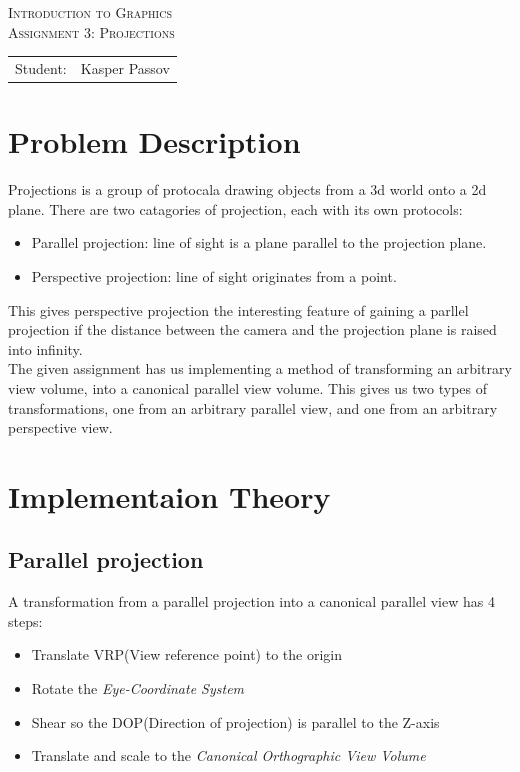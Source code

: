 \documentclass{article}
\begin{document}
\begin{titlepage}
\begin{center}
\textsc{Introduction to Graphics}\\[0.5cm]
\textsc{Assignment 3: Projections}\\[0.5cm]
\vspace{2 cm}
\begin{tabular}{ll}
Student: & Kasper Passov\\
\end{tabular}
\end{center}
\vspace{5 cm}
\newpage
\end{titlepage}

\section{Problem Description}
Projections is a group of protocala drawing objects 
from a 3d world onto a 2d plane. There are two catagories
of projection, each with its own protocols:
\begin{itemize}
    \item{Parallel projection:} line of sight is a plane parallel to the projection plane.
    \item{Perspective projection:} line of sight originates from a point.
\end{itemize}
This gives perspective projection the interesting feature of gaining a
parllel projection if the distance between the camera and the projection
plane is raised into infinity.\\
The given assignment has us implementing a method of transforming an
arbitrary view volume, into a canonical parallel view volume.
This gives us two types of transformations, one from an arbitrary
parallel view, and one from an arbitrary perspective view.

\section{Implementaion Theory}
\subsection{Parallel projection}
A transformation from a parallel projection into a canonical
parallel view has 4 steps:
\begin{itemize}
    \item{Translate VRP(View reference point) to the origin}
    \item{Rotate the \emph{Eye-Coordinate System}}
    \item{Shear so the DOP(Direction of projection) is parallel to the Z-axis}
    \item{Translate and scale to the \emph{Canonical Orthographic View Volume}}
\end{itemize}
\end{document}
